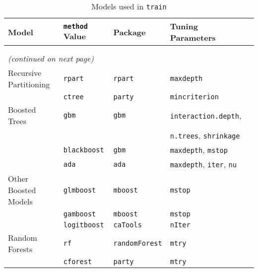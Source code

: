 \documentclass[12pt]{article}
\begin{document}
\begin{longtable}{lllll}
\caption{Models used in \texttt{train}} \\ \label{T:methods}
{\bf Model} & {\bf \texttt{method} Value} & {\bf Package} & {\bf Tuning Parameters}\\
\hline \\
\endhead
\\
\multicolumn{5}{l}{{{\small \em (continued on next page)}}} \\
\endfoot
\hline
\endlastfoot
      Recursive Partitioning &
         \texttt{rpart} & 
            \texttt{rpart}       & 
            \texttt{maxdepth} \\  
       &
         \texttt{ctree} & 
            \texttt{party}       & 
            \texttt{mincriterion} \\   
                  
      Boosted Trees &
         \texttt{gbm} & 
            \texttt{gbm}       & 
            \texttt{interaction.depth}, \\
      & & & \texttt{n.trees}, \texttt{shrinkage}  \\

       &
         \texttt{blackboost} & 
            \texttt{gbm}       & 
            \texttt{maxdepth}, \texttt{mstop}\\
            
       &
         \texttt{ada} & 
            \texttt{ada}       & 
            \texttt{maxdepth}, \texttt{iter}, \texttt{nu}\\            
     
      Other Boosted Models &
         \texttt{glmboost} & 
            \texttt{mboost}       &          
            \texttt{mstop}\\   
      &      
         \texttt{gamboost} & 
            \texttt{mboost}       &          
            \texttt{mstop}\\      
 
      &      
         \texttt{logitboost} & 
            \texttt{caTools}       &          
            \texttt{nIter}\\                
                 
      Random Forests & 
         \texttt{rf} & 
            \texttt{randomForest}       & 
            \texttt{mtry} \\
                        
       & 
         \texttt{cforest} & 
            \texttt{party}       & 
            \texttt{mtry} \\     
                        

\end{longtable}
\end{document}
